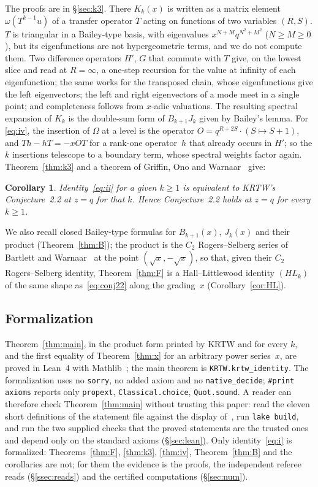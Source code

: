 \documentclass[11pt]{amsart}
\newtheorem{corollary}[theorem]{Corollary}
\theoremstyle{definition}
\numberwithin{equation}{section}
\newcommand{\fpath}[1]{\nolinkurl{#1}}
\begin{document}
The proofs are in §\ref{sec:k3}. There $K_k(x)$ is written as a matrix element $\omega(T^{k-1}u)$ of a transfer
operator $T$ acting on functions of two variables $(R,S)$. $T$ is triangular in a Bailey-type basis, with
eigenvalues $x^{N+M}q^{N^2+M^2}$ ($N\ge M\ge0$), but its eigenfunctions are not hypergeometric terms, and we do
not compute them. Two difference operators $H'$, $G$ that commute with $T$ give, on the lowest slice and read at
$R=\infty$, a one-step recursion for the value at infinity of each eigenfunction; the same works for the
transposed chain, whose eigenfunctions give the left eigenvectors; the left and right eigenvectors of a mode
meet in a single point; and completeness follows from $x$-adic valuations. The resulting spectral expansion of
$K_k$ is the double-sum form of $B_{k+1}J_k$ given by Bailey's lemma. For \eqref{eq:iv}, the insertion of $\Omega$
at a level is the operator $O=q^{R+2S}\cdot(S\mapsto S+1)$, and $Th-hT=-xOT$ for a rank-one operator~$h$ that already
occurs in $H'$; so the $k$ insertions telescope to a boundary term, whose spectral weights factor again.
Theorem~\ref{thm:k3} and a theorem of Griffin, Ono and Warnaar~\cite[Theorem~1.3]{GOW} give:

\begin{corollary}\label{cor:zq}
Identity~\eqref{eq:ii} for a given $k\ge1$ is equivalent to KRTW's Conjecture~2.2 at $z=q$ for that $k$. Hence
Conjecture~2.2 holds at $z=q$ for every $k\ge1$.
\end{corollary}

We also recall closed Bailey-type formulas for $B_{k+1}(x)$, $J_k(x)$ and their product (Theorem~\ref{thm:B}); the
product is the $C_2$ Rogers--Selberg series of Bartlett and Warnaar~\cite{BW} at the point $(\sqrt x,-\sqrt x)$,
so that, given their $C_2$ Rogers--Selberg identity, Theorem~\ref{thm:F} is a Hall--Littlewood identity $(HL_k)$
of the same shape as~\eqref{eq:conj22} along the grading~$x$ (Corollary~\ref{cor:HL}).

\subsection{Formalization}
Theorem~\ref{thm:main}, in the product form printed by KRTW and for every $k$, and the first equality
of Theorem~\ref{thm:x} for an arbitrary power series~$x$, are proved in Lean~4 with
Mathlib~\cite{Lean4,Mathlib}; the main theorem is \fpath{KRTW.krtw_identity}. The formalization uses no
\texttt{sorry}, no added axiom and no \texttt{native\_decide}; \verb|#print axioms| reports only
\texttt{propext}, \texttt{Classical.choice}, \texttt{Quot.sound}. A reader can therefore check
Theorem~\ref{thm:main} without trusting this paper: read the eleven short definitions of the statement
file against the display of~\cite{KRTW}, run \texttt{lake build}, and run the two supplied checks that the
proved statements are the trusted ones and depend only on the standard axioms (§\ref{sec:lean}). Only
identity~\eqref{eq:i} is formalized: Theorems~\ref{thm:F}, \ref{thm:k3}, \ref{thm:iv}, Theorem~\ref{thm:B} and the
corollaries are not; for them the evidence is the proofs, the independent referee reads (§\ref{ssec:reads}) and
the certified computations (§\ref{sec:num}).
\end{document}
